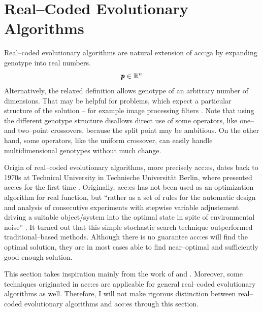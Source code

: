 \section{Real--Coded Evolutionary Algorithms}
\label{chap:realcodedea}

Real--coded evolutionary algorithms are natural extension of \acrshort{acc:ga} by expanding genotype into real numbers.
$$
\pmb{p} \in \mathbb{R}^{n}
$$
Alternatively, the relaxed definition allows genotype of an arbitrary number of dimensions. That may be helpful for problems, which expect a particular structure of the solution -- for example image processing filters \citep{WVDF}. Note that using the different genotype structure disallows direct use of some operators, like one-- and two--point crossovers, because the split point may be ambitious. On the other hand, some operators, like the uniform crossover, can easily handle multidimensional genotypes without much change.

Origin of real--coded evolutionary algorithms, more precisely \acrfull{acc:es}, dates back to 1970s at Technical University in Technische Universität Berlin, where \citeauthor*{ES-original} presented \acrshort{acc:es} for the first time \citep{ES-original}. Originally, \acrshort{acc:es} has not been used as an optimization algorithm for real function, but \enquote{rather as a set of rules for the automatic design and analysis of consecutive experiments with stepwise variable adjustement driving a suitable object/system into the optimal state in spite of environmental noise} \citep{EScomprehensiveintroduction}. It turned out that this simple stochastic search technique outperformed traditional--based methods. Although there is no guarantee \acrshort{acc:es} will find the optimal solution, they are in most cases able to find near--optimal and sufficiently good enough solution.

This section takes inspiration mainly from the work of \citet*{IntroductionToEA} and \citet*{EScomprehensiveintroduction}. Moreover, some techniques originated in \acrshort{acc:es} are applicable for general real--coded evolutionary algorithms as well. Therefore, I will not make rigorous distinction between real--coded evolutionary algorithms and \acrshort{acc:es} through this section.

